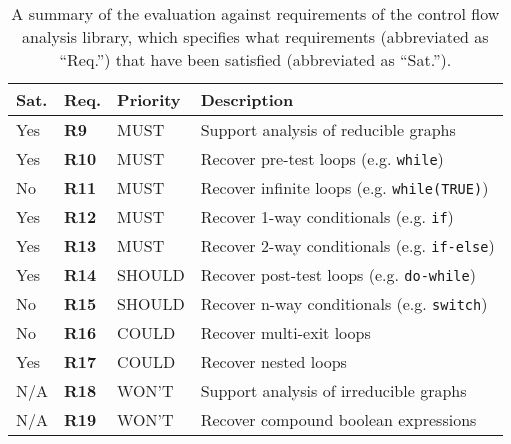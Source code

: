 \begin{table}[htbp]
	\begin{center}
		\begin{tabular}{|l|l|l|l|}
			\hline
			Sat. & Req. & Priority & Description \\
			\hline
			\rowcolor{light_green_3}
			Yes & \textbf{R9} & MUST & Support analysis of reducible graphs \\
			\rowcolor{light_green_3}
			Yes & \textbf{R10} & MUST & Recover pre-test loops (e.g. \texttt{while}) \\
			\rowcolor{light_red_3}
			No & \textbf{R11} & MUST & Recover infinite loops (e.g. \texttt{while(TRUE)}) \\
			\rowcolor{light_green_3}
			Yes & \textbf{R12} & MUST & Recover 1-way conditionals (e.g. \texttt{if}) \\
			\rowcolor{light_green_3}
			Yes & \textbf{R13} & MUST & Recover 2-way conditionals (e.g. \texttt{if-else}) \\
			\hline
			\rowcolor{light_green_3}
			Yes & \textbf{R14} & SHOULD & Recover post-test loops (e.g. \texttt{do-while}) \\
			\rowcolor{light_red_3}
			No & \textbf{R15} & SHOULD & Recover n-way conditionals (e.g. \texttt{switch}) \\
			\hline
			\rowcolor{light_red_3}
			No & \textbf{R16} & COULD & Recover multi-exit loops \\
			\rowcolor{light_green_3}
			Yes & \textbf{R17} & COULD & Recover nested loops \\
			\hline
			N/A & \textbf{R18} & WON'T & Support analysis of irreducible graphs \\
			N/A & \textbf{R19} & WON'T & Recover compound boolean expressions \\
			\hline
		\end{tabular}
	\end{center}
	\caption{A summary of the evaluation against requirements of the control flow analysis library, which specifies what requirements (abbreviated as ``Req.'') that have been satisfied (abbreviated as ``Sat.'').}
	\label{tbl:eval_summary_of_control_flow_analysis_library}
\end{table}





